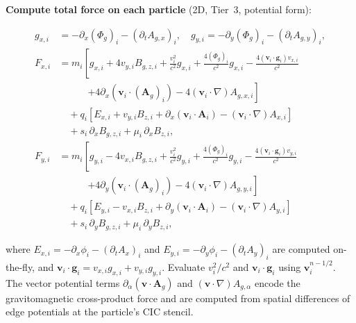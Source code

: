 \documentclass[11pt,a4paper]{article}
\newcommand{\vv}[1]{\mathbf{#1}}
\newcommand{\Phig}{\Phi_g}
\newcommand{\Ag}{\vv{A}_g}
\begin{document}
\begin{algsteps}
  \item \textbf{Compute total force on each particle} (2D, Tier~3, potential form):
  \begin{eqbox}
  \begin{align*}
    g_{x,i} &= -\partial_x(\Phig)_{i} - (\partial_t A_{g,x})_i, \quad g_{y,i} = -\partial_y(\Phig)_{i} - (\partial_t A_{g,y})_i, \\[4pt]
    F_{x,i} &= m_i\!\left[g_{x,i}
                         + 4v_{y,i}B_{g,z,i}
                         + \frac{v_i^2}{c^2}g_{x,i}
                         + \frac{4(\Phig)_i}{c^2}g_{x,i}
                         - \frac{4(\vv{v}_i\cdot\vv{g}_i)v_{x,i}}{c^2}\right. \\
            &\qquad\quad \left.+ 4\partial_x(\vv{v}_i\cdot(\Ag)_{i}) - 4(\vv{v}_i\cdot\nabla)A_{g,x,i}\right] \\
            &\quad + q_i\!\left[E_{x,i} + v_{y,i}B_{z,i}
                         + \partial_x(\vv{v}_i\cdot\vv{A}_i) - (\vv{v}_i\cdot\nabla)A_{x,i}\right] \\
            &\quad + s_i\,\partial_x B_{g,z,i} + \mu_i\,\partial_x B_{z,i}, \\[6pt]
    F_{y,i} &= m_i\!\left[g_{y,i}
                         - 4v_{x,i}B_{g,z,i}
                         + \frac{v_i^2}{c^2}g_{y,i}
                         + \frac{4(\Phig)_i}{c^2}g_{y,i}
                         - \frac{4(\vv{v}_i\cdot\vv{g}_i)v_{y,i}}{c^2}\right. \\
            &\qquad\quad \left.+ 4\partial_y(\vv{v}_i\cdot(\Ag)_{i}) - 4(\vv{v}_i\cdot\nabla)A_{g,y,i}\right] \\
            &\quad + q_i\!\left[E_{y,i} - v_{x,i}B_{z,i}
                         + \partial_y(\vv{v}_i\cdot\vv{A}_i) - (\vv{v}_i\cdot\nabla)A_{y,i}\right] \\
            &\quad + s_i\,\partial_y B_{g,z,i} + \mu_i\,\partial_y B_{z,i},
  \end{align*}
  \end{eqbox}
  where $E_{x,i} = -\partial_x\phi_i - (\partial_t A_x)_i$ and $E_{y,i} = -\partial_y\phi_i - (\partial_t A_y)_i$ are computed on-the-fly, and $\vv{v}_i\cdot\vv{g}_i = v_{x,i}g_{x,i} + v_{y,i}g_{y,i}$.  Evaluate $v_i^2/c^2$ and $\vv{v}_i\cdot\vv{g}_i$ using $\vv{v}_i^{n-1/2}$. The vector potential terms $\partial_\alpha(\vv{v}\cdot\Ag)$ and $(\vv{v}\cdot\nabla)A_{g,\alpha}$ encode the gravitomagnetic cross-product force and are computed from spatial differences of edge potentials at the particle's CIC stencil.


\end{algsteps}
\end{document}
